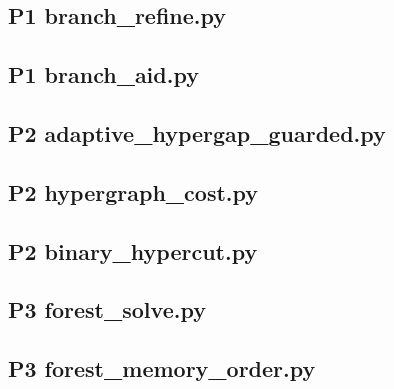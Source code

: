 \documentclass[anonymous,withtoc]{gmcm2026}
\begin{document}
\FloatBarrier
{}
\subsection{P1 branch\_refine.py}

\subsection{P1 branch\_aid.py}

\subsection{P2 adaptive\_hypergap\_guarded.py}

\subsection{P2 hypergraph\_cost.py}

\subsection{P2 binary\_hypercut.py}

\subsection{P3 forest\_solve.py}

\subsection{P3 forest\_memory\_order.py}

\end{document}
